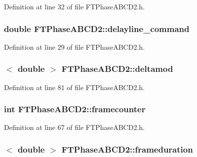 Definition at line 32 of file FTPhaseABCD2.h.

\hypertarget{classFTPhaseABCD2_a7f4b7f87005097bc4fc7674187c5c8d9}{
\subsubsection[{delayline\_\-command}]{\setlength{\rightskip}{0pt plus 5cm}double {\bf FTPhaseABCD2::delayline\_\-command}}}
\label{classFTPhaseABCD2_a7f4b7f87005097bc4fc7674187c5c8d9}


Definition at line 29 of file FTPhaseABCD2.h.

\hypertarget{classFTPhaseABCD2_adb45ef3385f322f04a5fae6a4fc5f8d0}{
\subsubsection[{deltamod}]{$<$ double $>$ {\bf FTPhaseABCD2::deltamod}}}
\label{classFTPhaseABCD2_adb45ef3385f322f04a5fae6a4fc5f8d0}


Definition at line 81 of file FTPhaseABCD2.h.

\hypertarget{classFTPhaseABCD2_ab20a33f32bb64bb904caf74197593f2d}{
\subsubsection[{framecounter}]{\setlength{\rightskip}{0pt plus 5cm}int {\bf FTPhaseABCD2::framecounter}}}
\label{classFTPhaseABCD2_ab20a33f32bb64bb904caf74197593f2d}


Definition at line 67 of file FTPhaseABCD2.h.

\hypertarget{classFTPhaseABCD2_abedbf8d6e352a94657090c240ae5b567}{
\subsubsection[{frameduration}]{$<$ double $>$ {\bf FTPhaseABCD2::frameduration}}}
\label{classFTPhaseABCD2_abedbf8d6e352a94657090c240ae5b567}


